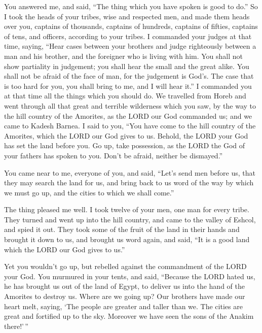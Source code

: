  You answered me, and said, ``The thing which you have
spoken is good to do.''  So I took the heads of your
tribes, wise and respected men, and made them heads over you, captains
of thousands, captains of hundreds, captains of fifties, captains of
tens, and officers, according to your tribes.  I commanded
your judges at that time, saying, ``Hear cases between your brothers and
judge righteously between a man and his brother, and the foreigner who
is living with him.  You shall not show partiality in
judgement; you shall hear the small and the great alike. You shall not
be afraid of the face of man, for the judgement is God's. The case that
is too hard for you, you shall bring to me, and I will hear it.''
 I commanded you at that time all the things which you
should do.  We travelled from Horeb and went through all
that great and terrible wilderness which you saw, by the way to the hill
country of the Amorites, as the LORD our God commanded us; and we came
to Kadesh Barnea.  I said to you, ``You have come to the
hill country of the Amorites, which the LORD our God gives to us.
 Behold, the LORD your God has set the land before you. Go
up, take possession, as the LORD the God of your fathers has spoken to
you. Don't be afraid, neither be dismayed.''

 You came near to me, everyone of you, and said, ``Let's
send men before us, that they may search the land for us, and bring back
to us word of the way by which we must go up, and the cities to which we
shall come.''

 The thing pleased me well. I took twelve of your men, one
man for every tribe.  They turned and went up into the hill
country, and came to the valley of Eshcol, and spied it out.
 They took some of the fruit of the land in their hands and
brought it down to us, and brought us word again, and said, ``It is a
good land which the LORD our God gives to us.''

 Yet you wouldn't go up, but rebelled against the
commandment of the LORD your God.  You murmured in your
tents, and said, ``Because the LORD hated us, he has brought us out of
the land of Egypt, to deliver us into the hand of the Amorites to
destroy us.  Where are we going up? Our brothers have made
our heart melt, saying, `The people are greater and taller than we. The
cities are great and fortified up to the sky. Moreover we have seen the
sons of the Anakim there!'\,''

